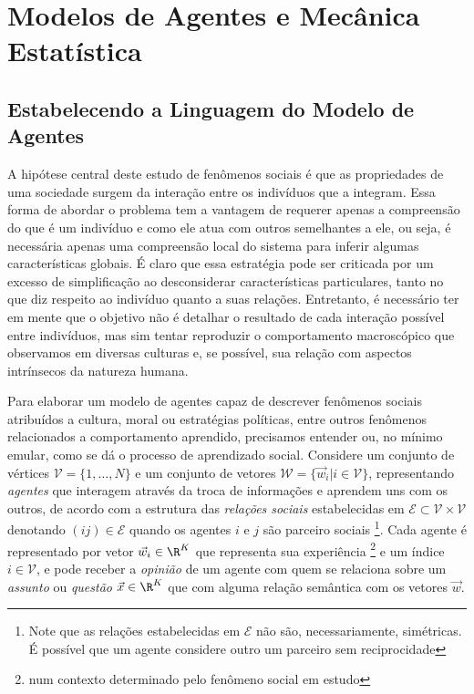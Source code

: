 \section{Modelos de Agentes e Mecânica Estatística}
\label{sec:AMSM}

\subsection{Estabelecendo a Linguagem do Modelo de Agentes}\label{ssec:AMSM1}
A hipótese central deste estudo de fenômenos sociais é que as
propriedades de uma sociedade surgem da interação entre os indivíduos
que a integram.  Essa forma de abordar o problema tem a vantagem de
requerer apenas a compreensão do que é um indivíduo e como ele atua
com outros semelhantes a ele, ou seja, é necessária apenas uma
compreensão local do sistema para inferir algumas características
globais.  É claro que essa estratégia pode ser criticada por um
excesso de simplificação ao desconsiderar características
particulares, tanto no que diz respeito ao indivíduo quanto a suas
relações.  Entretanto, é necessário ter em mente que o objetivo não é
detalhar o resultado de cada interação possível entre indivíduos, mas
sim tentar reproduzir o comportamento macroscópico que observamos em
diversas culturas e, se possível, sua relação com aspectos intrínsecos
da natureza humana.

\newcommand{\agt}[1]{\ensuremath{\vec{w}_{#1}}}
\newcommand{\vrt}{\ensuremath{\mathcal{V}}}
\newcommand{\edg}{\ensuremath{\mathcal{E}}}
\newcommand{\MM}{\ensuremath{\mathcal{W}}} Para elaborar um modelo de
agentes capaz de descrever fenômenos sociais atribuídos a cultura,
moral ou estratégias políticas, entre outros fenômenos relacionados a
comportamento aprendido, precisamos entender ou, no mínimo emular,
como se dá o processo de aprendizado social. Considere um conjunto de
vértices $\vrt = \{1,\dots,N\}$ e um conjunto de vetores $\MM =
\{\agt{i} | i \in \vrt \}$, representando \emph{agentes} que interagem
através da troca de informações e aprendem uns com os outros, de
acordo com a estrutura das \emph{relações sociais} estabelecidas em
$\edg \subset \vrt \times \vrt$ denotando $(ij)\in\edg$ quando os
agentes $i$ e $j$ são parceiro sociais \footnote{Note que as relações
  estabelecidas em $\edg$ não são, necessariamente, simétricas. É
  possível que um agente considere outro um parceiro sem
  reciprocidade}.  Cada agente é representado por vetor $\agt{i} \in
\R^K$ que representa sua experiência \footnote{num contexto
  determinado pelo fenômeno social em estudo} e um índice $i \in
\vrt$, e pode receber a \emph{opinião} de um agente com quem se
relaciona sobre um \emph{assunto} ou \emph{questão} $\vec{x} \in \R^K$
que com alguma relação semântica com os vetores $\vec{w}$.

